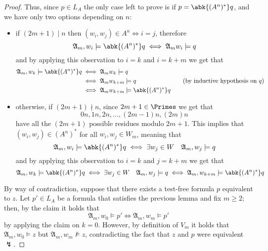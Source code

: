\documentclass[a4paper, 12pt]{report}
\begin{document}
\begin{proof}
{            Thus, since $p \in L_A$ the only case left to prove is if $p = \abk {(A^n)^*}q$, and we have only two options depending on $n$:

            \begin{itemize}
                \item if $(2m + 1) \mid n$ then $(w_i, w_j) \in A^n \iff i = j$, therefore $$\mathfrak A_m, w_i \models \abk{(A^n)^*}q \iff \mathfrak A_m w_i \models q$$ and by applying this observation to $i = k$ and $i = k + m$ we get that
                    \begin{equation*}
                        \begin{alignedat}{2}
                            \mathfrak A_m, w_k \models \abk{(A^n)^*}q &\iff \mathfrak A_m w_k \models q && \\
                                                                      &\iff \mathfrak A_m w_{k + m} \models q && \quad \quad (\mbox{by inductive hypothesis on $q$})\\
                                                                      &\iff \mathfrak A_m w_{k + m} \models \abk{(A^n)^*}q &&
                        \end{alignedat}
                    \end{equation*}
                \item otherwise, if $(2m + 1) \nmid n$, since $2m + 1 \in \Primes$ we get that $$0n, 1n, 2n, \ldots, (2m - 1)n, (2m)n$$ have all the $(2m + 1)$ possible residues modulo $2m + 1$. This implies that $(w_i, w_j) \in (A^n)^*$ for all $w_i, w_j \in W_m$, meaning that $$\mathfrak A_m, w_i \models \abk{(A^n)^*}q \iff \exists w_j \in W \quad \mathfrak A_m, w_j \models q$$ and by applying this observation to $i = k$ and $j = k + m$ we get that $$\mathfrak A_m, w_k \models \abk{(A^n)^*}q \iff \exists w_j \in W \quad \mathfrak A_m, w_j \models q \iff \mathfrak A_m, w_{k + m} \models \abk{(A^n)^*}q$$
            \end{itemize}
        }

        By way of contradiction, suppose that there exists a test-free formula $p$ equivalent to $z$. Let $p' \in L_A$ be a formula that satisfies the previous lemma and fix $m \ge 2$; then, by the claim it holds that $$\mathfrak A_m, w_0 \models p' \iff \mathfrak A_m, w_{m} \models p'$$ by applying the claim on $k = 0$. However, by definition of $V_m$ it holds that $\mathfrak A_m, w_0 \models z$ but $\mathfrak A_m, w_m \not\models z$, contradicting the fact that $z$ and $p$ were equivalent $\lightning$.
    \end{proof}
\end{document}
